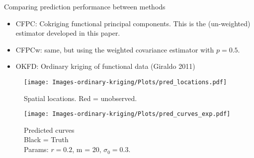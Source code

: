 \documentclass{beamer}
\begin{document}

\begin{frame}[t]{Comparing prediction performance between methods}
	\vspace{0.6in}
	\begin{itemize}
		\item CFPC: Cokriging functional principal components. This is the (un-weighted) estimator developed in this paper.
		\item CFPCw: same, but using the weighted covariance estimator with $p=0.5$.
		\item OKFD: Ordinary kriging of functional data (Giraldo 2011)
	\end{itemize}
\end{frame}

\begin{frame}[t]{}
	\begin{minipage}{0.4\textwidth}
		\begin{figure}
			\begin{center}
				\texttt{[image: Images-ordinary-kriging/Plots/pred\_locations.pdf]}
			\end{center}
			\caption{Spatial locations. Red = unobserved.}
		\end{figure}
	\end{minipage}
	\begin{minipage}{0.5\textwidth}
		\begin{figure}
			\begin{center}
				\texttt{[image: Images-ordinary-kriging/Plots/pred\_curves\_exp.pdf]}
			\end{center}
			\caption{Predicted curves\\ Black = Truth\\ Params: $r = 0.2$, m = 20, $\sigma_0 = 0.3$.  }
		\end{figure}
	\end{minipage}
\end{frame}
\end{document}
